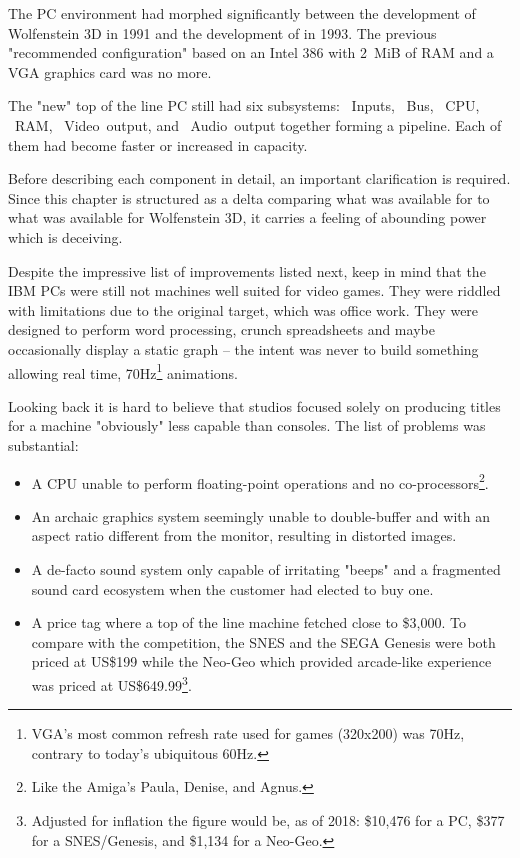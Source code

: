 The PC environment had morphed significantly between the development of Wolfenstein 3D in 1991 and the development of \doom{} in 1993. The previous "recommended configuration" based on an Intel 386 with 2~MiB of RAM and a VGA graphics card was no more.\\
\par
The "new" top of the line PC still had six subsystems: ~Inputs, ~Bus, ~CPU, ~RAM, ~Video~output, and ~Audio~output together forming a pipeline. Each of them had become faster or increased in capacity.\\
\par
\vspace{2mm}
\par
 Before describing each component in detail, an important clarification is required. Since this chapter is structured as a delta comparing what was available for \doom{} to what was available for Wolfenstein 3D, it carries a feeling of abounding power which is deceiving. \\
 \par
 Despite the impressive list of improvements listed next, keep in mind that the IBM PCs were still not machines well suited for video games. They were riddled with limitations due to the original target, which was office work. They were designed to perform word processing, crunch spreadsheets and maybe occasionally display a static graph -- the intent was never to build something allowing real time, 70Hz\footnote{VGA's most common refresh rate used for games (320x200) was 70Hz, contrary to today's ubiquitous 60Hz.} animations.\\ 
\par 
Looking back it is hard to believe that studios focused solely on producing titles for a machine "obviously" less capable than consoles. The list of problems was substantial:
\begin{itemize}
\item A CPU unable to perform floating-point operations and no co-processors\footnote{Like the Amiga's Paula, Denise, and Agnus.}.
\item An archaic graphics system seemingly unable to double-buffer and with an aspect ratio different from the monitor, resulting in distorted images.
\item A de-facto sound system only capable of irritating "beeps" and a fragmented sound card ecosystem when the customer had elected to buy one.
\item A price tag where a top of the line machine fetched close to \$3,000. To compare with the competition, the SNES and the SEGA Genesis were both priced at US\$199 while the Neo-Geo which provided arcade-like experience was priced at US\$649.99\footnote{Adjusted for inflation the figure would be, as of 2018: \$10,476 for a PC, \$377 for a SNES/Genesis, and \$1,134 for a Neo-Geo.}.
\end{itemize}
